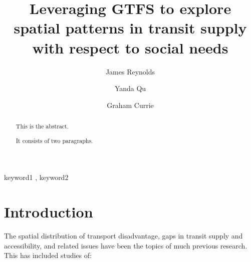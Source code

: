 \documentclass[preprint, 3p,
authoryear]{elsarticle} %
\begin{document}
\begin{frontmatter}

  \title{Leveraging GTFS to explore spatial patterns in transit supply
with respect to social needs}
    \author[Public Transport Research Group (PTRG)]{James Reynolds%
  }
    \author[Public Transport Research Group (PTRG)]{Yanda Qu%
  }
    \author[Public Transport Research Group (PTRG)]{Graham Currie%
  }
  
  \begin{abstract}
  This is the abstract.

  It consists of two paragraphs.
  \end{abstract}
    \begin{keyword}
    keyword1 \sep 
    keyword2
  \end{keyword}
  
 \end{frontmatter}

\hypertarget{introduction}{%
\section{Introduction}\label{introduction}}

The spatial distribution of transport disadvantage, gaps in transit
supply and accessibility, and related issues have been the topics of
much previous research. This has included studies of:
\end{document}
